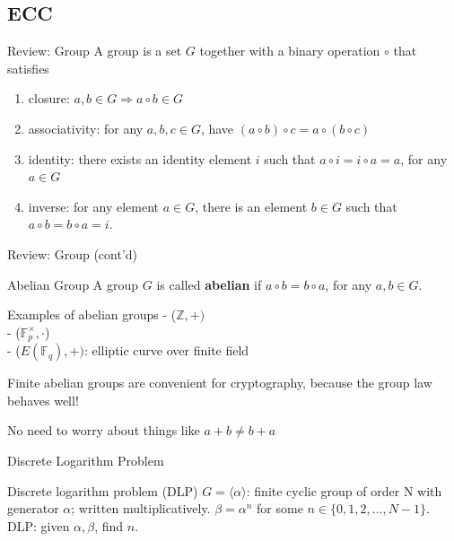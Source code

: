 \documentclass{beamer}
\begin{document}
\subsection{ECC}
\begin{frame}{Review: Group}
A group is a set $G$ together with a binary operation $\circ$ that satisfies
\begin{enumerate}
\item closure: $a, b\in G \Rightarrow a\circ b \in G$
\item associativity: for any $a, b, c\in G$, have $(a\circ b)\circ c 
= a\circ (b\circ c)$
\item identity: there exists an identity element $i$ such that 
$a\circ i = i\circ a = a$, for any $a\in G$
\item inverse: for any element $a\in G$, there is an element $b\in G$ such
that $a\circ b = b\circ a = i$. 
\end{enumerate}
\end{frame}

\begin{frame}{Review: Group (cont'd)}
\begin{block}{Abelian Group}
A group $G$ is called {\bf abelian} if $a\circ b = b\circ a$, for any 
$a, b\in G$.
\end{block}

\begin{block}{Examples of abelian groups}
- ($\mathbb{Z}, +)$\\
- ($\mathbb{F}_p^{\times}, \cdot$)\\
- ($E(\mathbb{F}_q), +)$: elliptic curve over finite field
\end{block}

Finite abelian groups are convenient for cryptography, because the group law
behaves well!  

\alert{No need to worry about things like $a + b \ne b + a$}

\end{frame}

\begin{frame}{Discrete Logarithm Problem} 
\begin{block}{Discrete logarithm problem (DLP)}
    $G = \langle\alpha\rangle$: finite cyclic group of order N with generator
$\alpha$; written multiplicatively. $\beta = \alpha^n$ for some $n \in \{0, 1,
2, \ldots, N - 1\}$.\\
    DLP: given $\alpha, \beta$, find $n$.
\end{block}

\end{frame}
\end{document}
